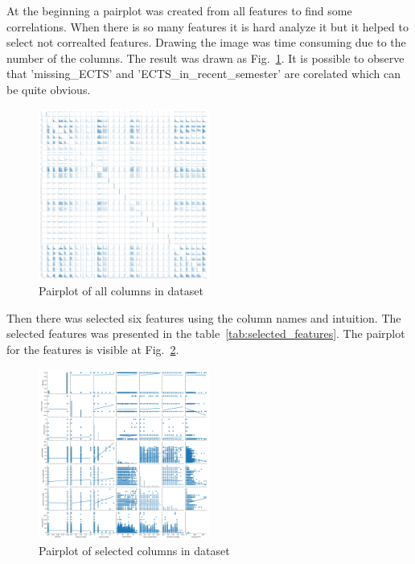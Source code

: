 
At the beginning a pairplot was created from all features to find some correlations. When there is so many features it is hard analyze it but it helped to select not correalted features. Drawing the image was time consuming due to the number of the columns. The result was drawn as Fig.~\ref{fig:all_features_pariplot}. It is possible to observe that 'missing\_ECTS' and 'ECTS\_in\_recent\_semester' are corelated which can be quite obvious.

\begin{figure}
    \includegraphics[width=0.5\textwidth]{img/pairplot.png}
    \caption{Pairplot of all columns in dataset}
    \label{fig:all_features_pariplot}
\end{figure}


Then there was selected six features using the column names and intuition. The selected features was presented in the table~\ref{tab:selected_features}. The pairplot for the features is visible at Fig.~\ref{fig:selected_features_pariplot}.

\begin{figure}
    \includegraphics[width=0.5\textwidth]{img/pairplot_selected_columns.png}
    \caption{Pairplot of selected columns in dataset}
    \label{fig:selected_features_pariplot}
\end{figure}

